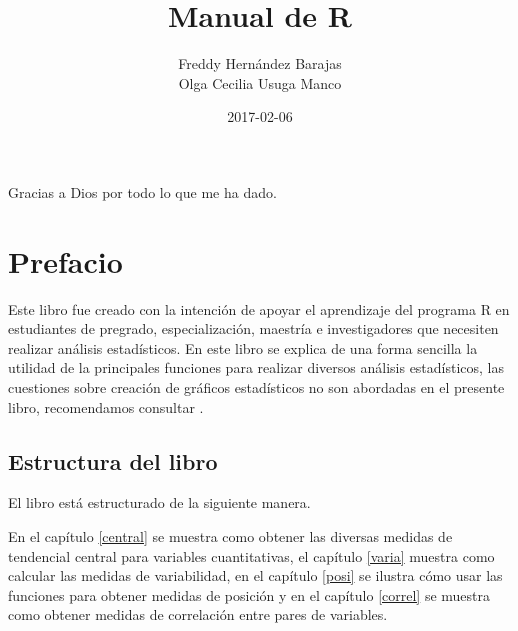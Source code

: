 \documentclass[10pt,]{krantz}
\title{Manual de R}
\author{Freddy Hernández Barajas\\
Olga Cecilia Usuga Manco}
\date{2017-02-06}
\let\proglang=\textsf
\begin{document}
\maketitle


\thispagestyle{empty}

\begin{center}

Gracias a Dios por todo lo que me ha dado.

\end{center}

\setlength{\abovedisplayskip}{-5pt}
\setlength{\abovedisplayshortskip}{-5pt}

{
\hypersetup{linkcolor=black}
\setcounter{tocdepth}{2}
\tableofcontents
}
\listoftables
\listoffigures
\chapter*{Prefacio}\label{prefacio}


Este libro fue creado con la intención de apoyar el aprendizaje del
programa \proglang{R} en estudiantes de pregrado, especialización,
maestría e investigadores que necesiten realizar análisis estadísticos.
En este libro se explica de una forma sencilla la utilidad de la
principales funciones para realizar diversos análisis estadísticos, las
cuestiones sobre creación de gráficos estadísticos no son abordadas en
el presente libro, recomendamos consultar \citet{correa_hernandez}.

\section*{Estructura del libro}\label{estructura-del-libro}


El libro está estructurado de la siguiente manera.

En el capítulo \ref{central} se muestra como obtener las diversas
medidas de tendencial central para variables cuantitativas, el capítulo
\ref{varia} muestra como calcular las medidas de variabilidad, en el
capítulo \ref{posi} se ilustra cómo usar las funciones para obtener
medidas de posición y en el capítulo \ref{correl} se muestra como
obtener medidas de correlación entre pares de variables.
\end{document}
